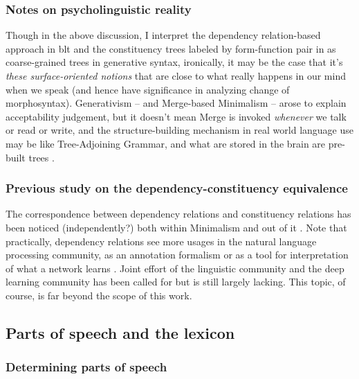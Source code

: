 \documentclass[UTF8, a4paper, oneside, scheme=plain]{ctexrep}
\begin{document}
\subsubsection{Notes on psycholinguistic reality}\label{sec:psycho-real}

Though in the above discussion, 
I interpret the dependency relation-based approach in \acs{blt} 
and the constituency trees labeled by form-function pair in \citet{cgel}
as coarse-grained trees in generative syntax,
ironically, it may be the case that 
it's \emph{these surface-oriented notions} that 
are close to what really happens in our mind 
when we speak
(and hence have significance in analyzing change of morphosyntax).
Generativism -- and Merge-based Minimalism -- arose to explain acceptability judgement,
but it doesn't mean Merge is invoked \emph{whenever} we talk or read or write,
and the structure-building mechanism in real world language use 
may be like Tree-Adjoining Grammar,
and what are stored in the brain 
are pre-built trees
\citep{brain-syntax-1,brain-syntax-2}.

\subsubsection{Previous study on the dependency-constituency equivalence}

The correspondence between dependency relations and constituency relations 
has been noticed (independently?) 
both within Minimalism
\citep{schneider1998linguistic,osborne2011bare,kobele2021minimalist}
and out of it \citep{kahane2015syntactic}. %
Note that practically, dependency relations see more usages in 
the natural language processing community,
as an annotation formalism or as a tool 
for interpretation of what a network learns \citep{chi2020finding}.
Joint effort of the linguistic community and the deep learning community
has been called for \citep{pater2019generative} 
but is still largely lacking.
This topic, of course, is far beyond the scope of this work.

\subsection{Parts of speech and the lexicon}

\subsubsection{Determining parts of speech}\label{sec:pos}
\end{document}
